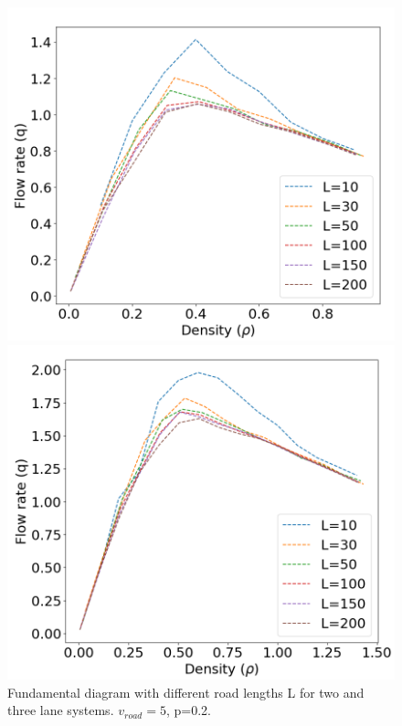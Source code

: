 \documentclass[a4paper,12pt]{article}
\begin{document}
\begin{figure}[H]
	 \centering
    \begin{minipage}{.5\textwidth}
        \centering
        \includegraphics[scale=0.34]{figrl1.png}
    \end{minipage}%
    \begin{minipage}{.5\textwidth}
        \centering
        \includegraphics[scale=0.34]{figrl2.png}
    \end{minipage}
    \caption{Fundamental diagram with different road lengths L for two and three lane systems. $v_{road}=5$, p=0.2.}
    \label{figrl}
\end{figure}
\end{document}
